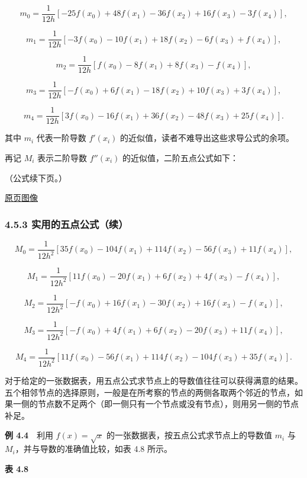 \documentclass[
  10pt,
  fontset=fandol]{ctexart}
\begin{document}
\[
m_0=\frac1{12h}[-25f(x_0)+48f(x_1)-36f(x_2)+16f(x_3)-3f(x_4)],
\]

\[
m_1=\frac1{12h}[-3f(x_0)-10f(x_1)+18f(x_2)-6f(x_3)+f(x_4)],
\]

\[
m_2=\frac1{12h}[f(x_0)-8f(x_1)+8f(x_3)-f(x_4)],
\]

\[
m_3=\frac1{12h}[-f(x_0)+6f(x_1)-18f(x_2)+10f(x_3)+3f(x_4)],
\]

\[
m_4=\frac1{12h}[3f(x_0)-16f(x_1)+36f(x_2)-48f(x_3)+25f(x_4)].
\]

其中 \(m_i\) 代表一阶导数 \(f'(x_i)\) 的近似值，读者不难导出这些求导公式的余项。

再记 \(M_i\) 表示二阶导数 \(f''(x_i)\) 的近似值，二阶五点公式如下：

（公式续下页。）

\href{../../source-images/pdf-116.jpeg}{原页图像}

\subsubsection{4.5.3 实用的五点公式（续）}\label{ux5b9eux7528ux7684ux4e94ux70b9ux516cux5f0fux7eed}

\[
M_0=\frac1{12h^2}[35f(x_0)-104f(x_1)+114f(x_2)-56f(x_3)+11f(x_4)],
\]

\[
M_1=\frac1{12h^2}[11f(x_0)-20f(x_1)+6f(x_2)+4f(x_3)-f(x_4)],
\]

\[
M_2=\frac1{12h^2}[-f(x_0)+16f(x_1)-30f(x_2)+16f(x_3)-f(x_4)],
\]

\[
M_3=\frac1{12h^2}[-f(x_0)+4f(x_1)+6f(x_2)-20f(x_3)+11f(x_4)],
\]

\[
M_4=\frac1{12h^2}[11f(x_0)-56f(x_1)+114f(x_2)-104f(x_3)+35f(x_4)].
\]

对于给定的一张数据表，用五点公式求节点上的导数值往往可以获得满意的结果。五个相邻节点的选择原则，一般是在所考察的节点的两侧各取两个邻近的节点，如果一侧的节点数不足两个（即一侧只有一个节点或没有节点），则用另一侧的节点补足。

\textbf{例 4.4}　利用 \(f(x)=\sqrt{x}\) 的一张数据表，按五点公式求节点上的导数值 \(m_i\) 与 \(M_i\)，并与导数的准确值比较，如表 4.8 所示。

\textbf{表 4.8}
\end{document}
